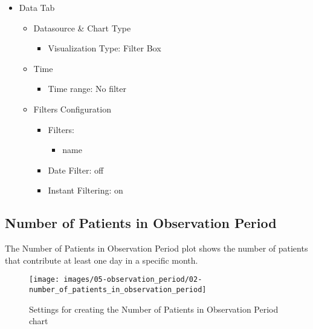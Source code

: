 \documentclass[
]{book}
\providecommand{\tightlist}{%
  \setlength{\itemsep}{0pt}\setlength{\parskip}{0pt}}
\begin{document}
\begin{itemize}
\tightlist
\item
  Data Tab

  \begin{itemize}
  \tightlist
  \item
    Datasource \& Chart Type

    \begin{itemize}
    \tightlist
    \item
      Visualization Type: Filter Box
    \end{itemize}
  \item
    Time

    \begin{itemize}
    \tightlist
    \item
      Time range: No filter
    \end{itemize}
  \item
    Filters Configuration

    \begin{itemize}
    \tightlist
    \item
      Filters:

      \begin{itemize}
      \tightlist
      \item
        name
      \end{itemize}
    \item
      Date Filter: off
    \item
      Instant Filtering: on
    \end{itemize}
  \end{itemize}
\end{itemize}

\hypertarget{numInObservationPeriod}{%
\subsection*{Number of Patients in Observation Period}\label{numInObservationPeriod}}

The Number of Patients in Observation Period plot shows the number of patients that contribute at least one day in a specific month.

\begin{figure}
\texttt{[image: images/05-observation\_period/02-number\_of\_patients\_in\_observation\_period]} \caption{Settings for creating the Number of Patients in Observation Period chart}\label{fig:numPatientsInObserPeriod}
\end{figure}
\end{document}
